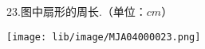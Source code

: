 23.图中扇形的周长.（单位：$cm$）

\begin{flushright}

    \texttt{[image: lib/image/MJA04000023.png]}

\end{flushright}



